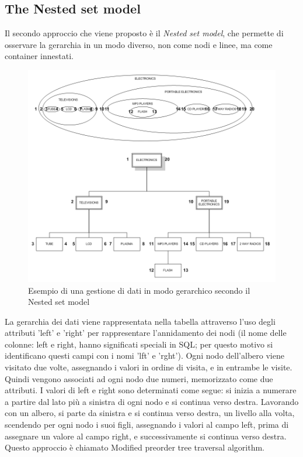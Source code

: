 \subsection{The Nested set model}
Il secondo approccio che viene proposto è il \textit{Nested set model}, che permette di osservare la gerarchia in un modo diverso, non 
come nodi e linee, ma come container innestati. \\

\begin{figure}[ht!]
    \centering
	\includegraphics[scale=0.55]{images/Nested_Tree_Model_ex.PNG}
	\caption{Esempio di una gestione di dati in modo gerarchico secondo il Nested set model}
\end{figure}

La gerarchia dei dati viene rappresentata nella tabella attraverso l'uso degli attributi 'left' e 'right' per rappresentare l'annidamento
dei nodi (il nome delle colonne: left e right, hanno significati speciali in SQL; per questo motivo si identificano questi campi con i 
nomi 'lft' e 'rght'). 
Ogni nodo dell'albero viene visitato due volte, assegnando i valori in ordine di visita, e in entrambe le visite. Quindi vengono 
associati ad ogni nodo due numeri, memorizzato come due attributi. 
I valori di left e right sono determinati come segue: si inizia a numerare a partire dal lato più a sinistra di ogni nodo e si continua 
verso destra. Lavorando con un albero, si parte da sinistra e si continua verso destra, un livello alla volta, scendendo per ogni
nodo i suoi figli, assegnando i valori al campo left, prima di assegnare un valore al campo right, e successivamente si continua verso 
destra. Questo approccio è chiamato Modified preorder tree traversal algorithm.

